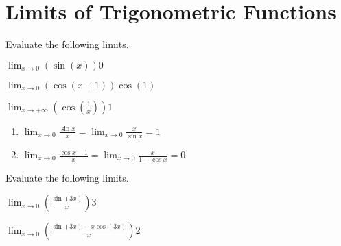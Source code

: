 \section{Limits of Trigonometric Functions}


\noindent Evaluate the following limits.

\problemans%
{$\displaystyle \lim_{x\rightarrow0} \left(\sin{\left(x\right)}\right)$}{$0$}

\problemans%
{$\displaystyle \lim_{x\rightarrow0} \left(\cos{\left(x + 1 \right)}\right)$}{$\cos{ \left( 1 \right) }$}

\problemans%
{$\displaystyle \lim_{x\rightarrow+\infty} \left(\cos{\left( \frac{1}{x} \right)}\right)$}{$1$}

\newpage

\begin{myframe}[arc=10pt,auto outer arc]
\begin{enumerate}
\item $\displaystyle \lim_{x\rightarrow 0} \frac{\sin{x}}{x} = \lim_{x\rightarrow 0} \frac{x}{\sin{x}} = 1$
\item $\displaystyle \lim_{x\rightarrow 0} \frac{\cos{x} - 1}{x} = \lim_{x\rightarrow 0} \frac{x}{1- \cos{x}} = 0$
\end{enumerate}
\end{myframe}

\noindent Evaluate the following limits.

\problemans%
{$\displaystyle \lim_{x\rightarrow 0} \left( \frac{\sin{\left( 3x \right)}}{x} \right)$}{$3$}

\problemans%
{$\displaystyle \lim_{x\rightarrow 0} \left( \frac{\sin{\left( 3x \right)} - x\cos{(3x)}}{x} \right)$}{$2$}

\newpage


